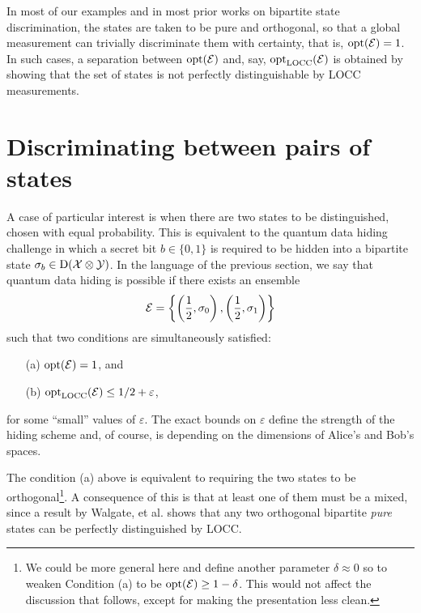 In most of our examples and in most prior works on bipartite state discrimination, 
the states are taken to be pure and orthogonal, so that a global measurement can 
trivially discriminate them with certainty, that is, $\operatorname{opt}(\mathcal{E}) = 1$.
In such cases, a separation between $\operatorname{opt}(\mathcal{E})$ and, say, $\operatorname{opt}_{\mathrm{LOCC}}(\mathcal{E})$ is obtained 
by showing that the set of states is not perfectly distinguishable by LOCC measurements.


\section{Discriminating between pairs of states}
A case of particular interest is when there are two states to be distinguished,
chosen with equal probability. 
This is equivalent to the quantum data hiding challenge in which a secret bit 
$b \in \{0,1\}$ is required to be hidden into a bipartite state 
$\sigma_{b}\in\mathrm{D}(\mathcal{X}\otimes\mathcal{Y})$. In the language of the previous section, 
we say that quantum data hiding is possible if there exists an ensemble
\begin{equation}
\mathcal{E} = \left\{\left(\frac{1}{2},\sigma_{0}\right),
        \left(\frac{1}{2},\sigma_{1}\right)\right\}
\end{equation}
such that two conditions are simultaneously satisfied:
\begin{itemize}
\item[(a)] $\operatorname{opt}(\mathcal{E}) = 1$, and
\item[(b)] $\operatorname{opt}_{\mathrm{LOCC}}(\mathcal{E}) \leq 1/2 + \varepsilon$,
\end{itemize}
for some ``small'' values of $\varepsilon$. The exact bounds on 
$\varepsilon$ define the strength of the hiding scheme and, 
of course, is depending on the dimensions of Alice's and Bob's spaces.

The condition (a) above is equivalent to requiring the two states to be 
orthogonal\footnote{We could be more general here and define another parameter
$\delta \approx 0$ so to weaken Condition (a) to be $\operatorname{opt}(\mathcal{E}) \geq 1 - \delta$.
This would not affect the discussion that follows, except for making the 
presentation less clean.}.
A consequence of this is that at least one of them must be a mixed,
since a result by Walgate, et al. \cite{Walgate00} shows that any two orthogonal 
bipartite \emph{pure} states can be perfectly distinguished by LOCC.

